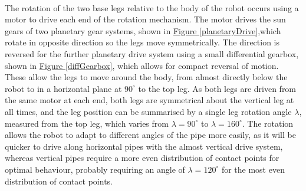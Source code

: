 \documentclass[11pt]{article}		%
\begin{document}
			\\
			The rotation of the two base legs relative to the body of the robot occurs using a motor to drive each end of the rotation mechanism.
			The motor drives the sun gears of two planetary gear systems, shown in \hyperref[planetaryDrive]{Figure \ref*{planetaryDrive}},which rotate in opposite direction so the legs move symmetrically.
			The direction is reversed for the further planetary drive system using a small differential gearbox, shown in \hyperref[diffGearbox]{Figure \ref*{diffGearbox}}, which allows for compact reversal of motion.
			These allow the legs to move around the body, from almost directly below the robot to in a horizontal plane at $90^\circ$ to the top leg.
			As both legs are driven from the same motor at each end, both legs are symmetrical about the vertical leg at all times, and the leg position can be summarised by a single leg rotation angle $\lambda$, measured from the top leg, which varies from $\lambda = 90^\circ$ to $\lambda = 160^\circ$.
			The rotation allows the robot to adapt to different angles of the pipe more easily, as it will be quicker to drive along horizontal pipes with the almost vertical drive system, whereas vertical pipes require a more even distribution of contact points for optimal behaviour, probably requiring an angle of $\lambda = 120^\circ$ for the most even distribution of contact points.
									
\end{document}
